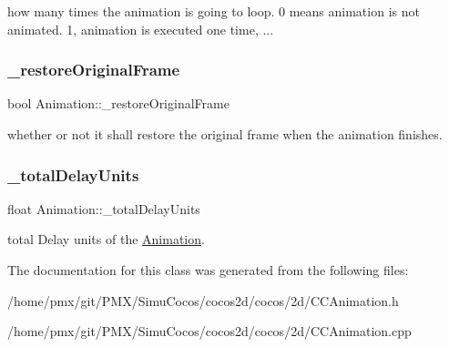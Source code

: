 how many times the animation is going to loop. 0 means animation is not animated. 1, animation is executed one time, ... \mbox{\label{classAnimation_ad03c361dbbe11f8a778a98e8c1afd517}} 
\subsubsection{\texorpdfstring{\+\_\+restore\+Original\+Frame}{\_restoreOriginalFrame}}
{\footnotesize\ttfamily bool Animation\+::\+\_\+restore\+Original\+Frame\hspace{0.3cm}{\ttfamily [protected]}}

whether or not it shall restore the original frame when the animation finishes. \mbox{\label{classAnimation_aa05672efcbdd64ac9247f052e2d0564d}} 
\subsubsection{\texorpdfstring{\+\_\+total\+Delay\+Units}{\_totalDelayUnits}}
{\footnotesize\ttfamily float Animation\+::\+\_\+total\+Delay\+Units\hspace{0.3cm}{\ttfamily [protected]}}

total Delay units of the \hyperlink{classAnimation}{Animation}. 

The documentation for this class was generated from the following files\+:\begin{DoxyCompactItemize}
\item 
/home/pmx/git/\+P\+M\+X/\+Simu\+Cocos/cocos2d/cocos/2d/C\+C\+Animation.\+h\item 
/home/pmx/git/\+P\+M\+X/\+Simu\+Cocos/cocos2d/cocos/2d/C\+C\+Animation.\+cpp\end{DoxyCompactItemize}
